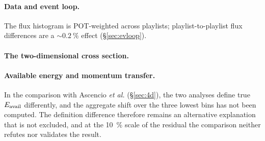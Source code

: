 \paragraph{Data and event loop.}
\label{rlim:experiment}
The flux histogram is POT-weighted across playlists; playlist-to-playlist flux differences are a $\sim\SI{0.2}{\percent}$ effect (\S\ref{sec:evloop}).

\paragraph{The two-dimensional cross section.}
\label{rlim:2d}


\paragraph{Available energy and momentum transfer.}
\label{rlim:3d}
In the comparison with Ascencio \emph{et al.} (\S\ref{sec:4d}), the two analyses define true $E_{\mathrm{avail}}$ differently, and the aggregate shift over the three lowest bins has not been computed. The definition difference therefore remains an alternative explanation that is not excluded, and at the \SI{10}{\percent} scale of the residual the comparison neither refutes nor validates the result.

